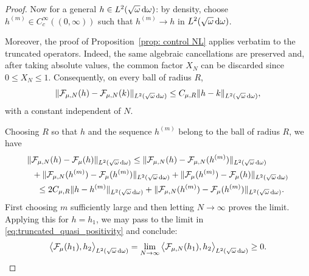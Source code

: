 \documentclass[reqno,11pt,letterpaper]{amsart}
\numberwithin{equation}{section}
\newcommand{\dd}{\, {\rm d}}
\newtheorem{lemma}[proposition]{Lemma}
\begin{document}
\begin{proof}
Now for a general $h\in L^2(\sqrt{\omega}\dd\omega)$: by density, choose
$h^{(m)}\in C_c^\infty((0,\infty))$ such that
$
h^{(m)}\to h $ in $L^2(\sqrt{\omega}\dd\omega)$.

Moreover, the proof of Proposition~\ref{prop: control NL} applies
verbatim to the truncated operators. Indeed, the same algebraic
cancellations are preserved and, after taking absolute values, the
common factor $X_N$ can be discarded since $0\leq X_N\leq1$.
Consequently, on every ball of radius $R$,
$$
\|\mathcal{F}_{\mu,N}(h)-\mathcal{F}_{\mu,N}(k)\|_{L^2(\sqrt{\omega}\dd\omega)}
\leq
C_{\mu,R}
\|h-k\|_{L^2(\sqrt{\omega}\dd\omega)},
$$
with a constant independent of $N$.


Choosing $R$ so that $h$ and the sequence $h^{(m)}$ belong to the ball
of radius $R$, we have
\begin{align*}
&\|\mathcal{F}_{\mu,N}(h)-\mathcal{F}_\mu(h)\|_{L^2(\sqrt{\omega}\dd\omega)}
\leq
\|\mathcal{F}_{\mu,N}(h)-\mathcal{F}_{\mu,N}(h^{(m)})\|_{L^2(\sqrt{\omega}\dd\omega)}
\\ & \hspace{0.2cm} + \|\mathcal{F}_{\mu,N}(h^{(m)})-\mathcal{F}_\mu(h^{(m)})\|_{L^2(\sqrt{\omega}\dd\omega)} +
\|\mathcal{F}_\mu(h^{(m)})-\mathcal{F}_\mu(h)\|_{L^2(\sqrt{\omega}\dd\omega)}
\\ & \hspace{0.4cm}\leq
2C_{\mu,R}\|h -h^{(m)}\|_{L^2(\sqrt{\omega}\dd\omega)} +
\|\mathcal{F}_{\mu,N}(h^{(m)})-\mathcal{F}_\mu(h^{(m)})\|_{L^2(\sqrt{\omega}\dd\omega)}.
\end{align*}
First choosing $m$ sufficiently large and then letting $N\to\infty$ proves the limit.
Applying this for $h=h_1$, we may pass to the limit
in \eqref{eq:truncated_quasi_positivity} and conclude:
$$
\big\langle \mathcal{F}_\mu(h_1), h_2
\big\rangle_{L^2(\sqrt{\omega} \dd\omega)}
= \lim_{N \to \infty}
\big\langle \mathcal{F}_{\mu,N}(h_1),h_2
\big\rangle_{L^2(\sqrt{\omega} \dd\omega)}
\geq 0.
$$
\end{proof}

\end{document}
